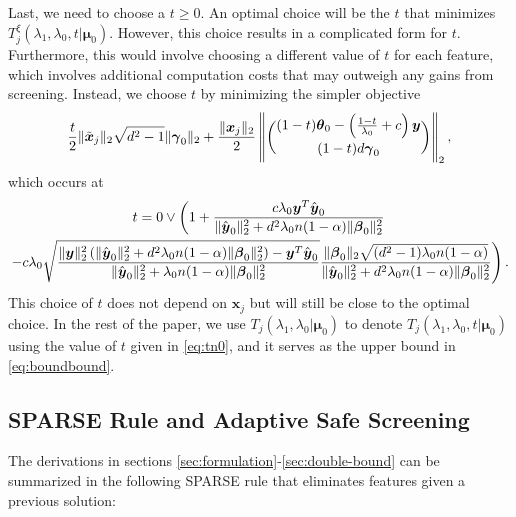 Last, we need to choose a $t\geq 0$. An optimal choice will be the $t$ that minimizes $T^\xi_j(\lambda_1,\lambda_0,t|\boldsymbol\mu_0)$. However, this choice results in a complicated form for $t$. Furthermore, this would involve choosing a different value of $t$ for each feature, which involves additional computation costs that may outweigh any gains from screening. Instead, we choose $t$ by minimizing the simpler objective
\begin{equation}
    \frac{t}{2}\lVert\tilde{\boldsymbol x}_j\rVert_2\sqrt{d^2-1}\lVert\boldsymbol\gamma_{0}\rVert_2+\frac{\lVert\boldsymbol x_j\rVert_2}{2}\left\Vert\binom{(1-t)\boldsymbol\theta_{0}-\left(\frac{1-t}{\lambda_0}+c\right)\boldsymbol y}{(1-t)d\boldsymbol\gamma_{0}}\right\Vert_2,
\end{equation}
which occurs at
\begin{multline}
    \label{eq:tn0}
    t=0\vee\left(1+\frac{c\lambda_0\boldsymbol y^T\hat{\boldsymbol y}_{0}}{\lVert\hat{\boldsymbol y}_{0}\rVert_2^2+d^2\lambda_0n(1-\alpha)\lVert\boldsymbol\beta_{0}\rVert_2^2}\right.\\
    \left.-c\lambda_0\sqrt{\frac{\lVert\boldsymbol y\rVert_2^2\left(\lVert\hat{\boldsymbol y}_{0}\rVert_2^2+d^2\lambda_0n(1-\alpha)\lVert\boldsymbol\beta_{0}\rVert_2^2\right)-\boldsymbol y^T\hat{\boldsymbol y}_{0}}{\lVert\hat{\boldsymbol y}_{0}\rVert_2^2+\lambda_0n(1-\alpha)\lVert\boldsymbol\beta_{0}\rVert_2^2}}
    \frac{\lVert\boldsymbol\beta_{0}\rVert_2\sqrt{(d^2-1)\lambda_0n(1-\alpha)}}{\lVert\hat{\boldsymbol y}_{0}\rVert_2^2+d^2\lambda_0n(1-\alpha)\lVert\boldsymbol\beta_{0}\rVert_2^2}\right).
\end{multline}
This choice of $t$ does not depend on $\boldsymbol x_j$ but will still be close to the optimal choice. In the rest of the paper, we use $T_j(\lambda_1,\lambda_0|\boldsymbol\mu_0)$ to denote $T_j(\lambda_1,\lambda_0,t|\boldsymbol\mu_0)$ using the value of $t$ given in \eqref{eq:tn0}, and it serves as the upper bound in \eqref{eq:boundbound}.

\subsection{SPARSE Rule and Adaptive Safe Screening}

The derivations in sections \ref{sec:formulation}-\ref{sec:double-bound} can be summarized in the following SPARSE rule that eliminates features given a previous solution:

